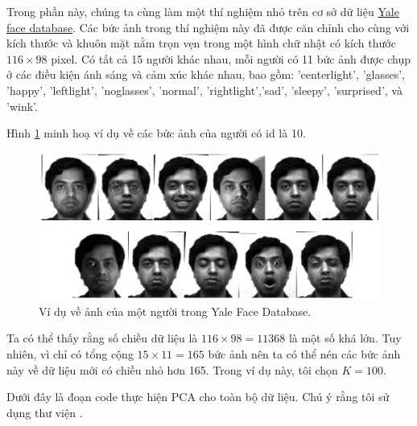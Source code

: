 Trong phần này, chúng ta cùng làm một thí nghiệm nhỏ trên cơ sở dữ liệu \href{http://vismod.media.mit.edu/vismod/classes/mas622-00/datasets/}{Yale face database}. Các bức ảnh trong thí nghiệm này đã được căn chỉnh cho cùng với kích thước và khuôn mặt nằm trọn vẹn trong một hình chữ nhật có kích thước $116 \times  98$ pixel. Có tất cả 15 người khác nhau, mỗi người có 11 bức ảnh được chụp ở các điều kiện ánh sáng và cảm xúc khác nhau, bao gồm: 'centerlight', 'glasses', 'happy', 'leftlight', 'noglasses', 'normal', 'rightlight','sad', 'sleepy', 'surprised', và 'wink'. 
 
Hình \ref{fig:28_1} minh hoạ ví dụ về các bức ảnh của người có id là 10. 
 

\begin{figure}[t]
\centering
    \includegraphics[width = \textwidth]{Chapters/07_DimemsionalityReduction/28_pca2/latex/yaleb_exs.pdf}
    \caption[]{Ví dụ về ảnh của một người trong Yale Face Database.}
    \label{fig:28_1}
\end{figure}
Ta có thể thấy rằng số chiều dữ liệu là $116 \times 98 = 11368$ là một số khá lớn. Tuy nhiên, vì chỉ có tổng cộng $15 \times 11 = 165$ bức ảnh nên ta có thể nén các bức ảnh này về dữ liệu mới có chiều nhỏ hơn 165. Trong ví dụ này, tôi chọn $K = 100$. 
 
Dưới đây là đoạn code thực hiện PCA cho toàn bộ dữ liệu. Chú ý rằng tôi sử dụng thư viện . 
 
